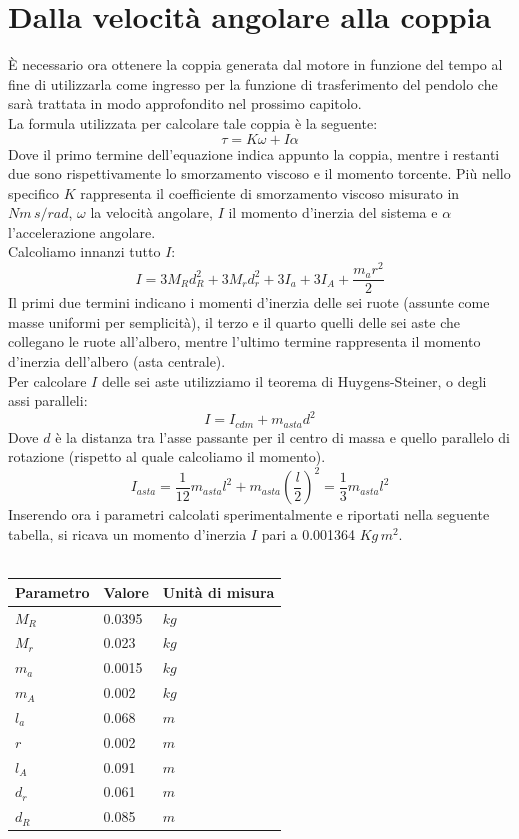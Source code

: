 \section{Dalla velocità angolare alla coppia}
È necessario ora ottenere la coppia generata dal motore in funzione del tempo al fine di utilizzarla come ingresso per la funzione di trasferimento del pendolo che sarà trattata in modo approfondito nel prossimo capitolo.\\
La formula utilizzata per calcolare tale coppia è la seguente:
$$
\tau=K\omega+I\alpha
$$
Dove il primo termine dell'equazione indica appunto la coppia, mentre i restanti due sono rispettivamente lo smorzamento viscoso e il momento torcente.
Più nello specifico $K$ rappresenta il coefficiente di smorzamento viscoso misurato in $Nm\,s/rad$, $\omega$ la velocità angolare, $I$ il momento d'inerzia del sistema e $\alpha$ l'accelerazione angolare.\\
Calcoliamo innanzi tutto $I$: 
$$
I=3M_Rd_R^2+3M_rd_r^2+3I_a+3I_A+\displaystyle\frac{m_ar^2}{2}
$$
Il primi due termini indicano i momenti d'inerzia delle sei ruote (assunte come masse uniformi per semplicità), il terzo e il quarto quelli delle sei aste che collegano le ruote all'albero, mentre l'ultimo termine rappresenta il momento d'inerzia dell'albero (asta centrale).\\
Per calcolare $I$ delle sei aste utilizziamo il teorema di Huygens-Steiner, o degli assi paralleli:
$$
I=I_{cdm}+m_{asta}d^2
$$
Dove $d$ è la distanza tra l'asse passante per il centro di massa e quello parallelo di rotazione (rispetto al quale calcoliamo il momento).\\
$$
I_{asta}=\displaystyle\frac{1}{12}m_{asta}l^2+m_{asta}(\displaystyle\frac{l}{2})^2=\displaystyle\frac{1}{3}m_{asta}l^2
$$
Inserendo ora i parametri calcolati sperimentalmente e riportati nella seguente tabella, si ricava un momento d'inerzia $I$ pari a 0.001364 $Kg\,m^2$.\\\\
\begin{tabular}{|l|l|l|}
	\hline
	\textbf{Parametro} & \textbf{Valore} & \textbf{Unità di misura}\\
	\hline
	$M_R$ & 0.0395 & $kg$\\
	\hline
	$M_r$ & 0.023 & $kg$ \\
	\hline
	$m_a$ & 0.0015 & $kg$\\	
	\hline
	$m_A$ & 0.002 & $kg$\\	
	\hline
	$l_a$ & 0.068 & $m$\\
	\hline
	$r$ & 0.002 & $m$\\
	\hline
	$l_A$ & 0.091 & $m$\\
	\hline
	$d_r$ & 0.061 & $m$\\
	\hline
	$d_R$ & 0.085 & $m$ \\
	\hline
\end{tabular}\\\\\\
